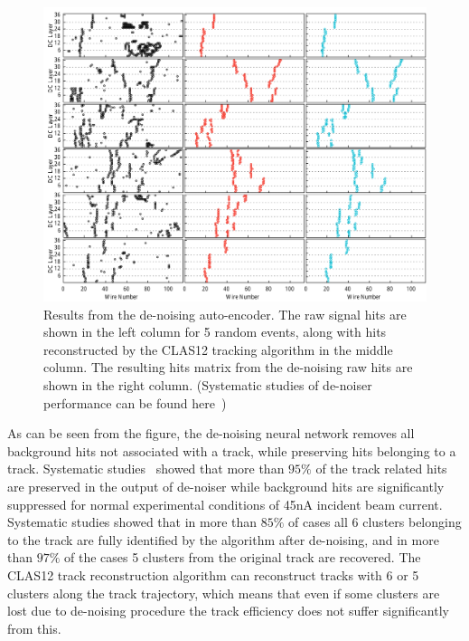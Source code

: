 \begin{figure}[!h]
\begin{center}
 \includegraphics[width=5.8in]{images/cnn_denoise_results.pdf}
\caption {Results from the de-noising auto-encoder. The raw signal hits are shown
in the left column for 5 random events, along with hits reconstructed by the 
CLAS12 tracking algorithm in the middle column. The resulting  hits matrix 
from the de-noising raw hits are shown in the right column. (Systematic studies 
of de-noiser performance can be found here~\cite{Thomadakis:2022zcd})}
 \label{network:cnn_results}
 \end{center}
\end{figure}

As can be seen from the figure, the de-noising neural network removes all background hits not 
associated with a track, while preserving hits belonging to a track. 
Systematic studies~\cite{Thomadakis:2022zcd} showed that more than 
$95\%$ of the track related hits are preserved in the output of de-noiser while 
background hits are significantly suppressed for normal experimental conditions of 45nA
incident beam current. Systematic studies showed that in more than $85\%$ of cases all 
6 clusters belonging to the track are fully identified by the algorithm after de-noising, 
and in more than $97\%$ of the cases 5 clusters from the original track are recovered. The CLAS12 
track reconstruction algorithm can reconstruct tracks with 6 or 5 clusters along the 
track trajectory, which means that even if some clusters are lost due to de-noising 
procedure the track efficiency does not suffer significantly from this.

